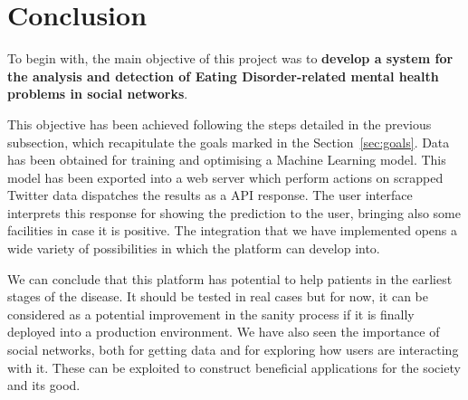 \section{Conclusion}
\label{sec:conclusion}

To begin with, the main objective of this project was to \textbf{develop a system for the analysis and detection of Eating Disorder-related mental health problems in social networks}.

This objective has been achieved following the steps detailed in the previous subsection, which recapitulate the goals marked in the Section~\ref{sec:goals}. Data has been obtained for training and optimising a Machine Learning model. This model has been exported into a web server which perform actions on scrapped Twitter data dispatches the results as a API response. The user interface interprets this response for showing the prediction to the user, bringing also some facilities in case it is positive. The integration that we have implemented opens a wide variety of possibilities in which the platform can develop into. 

We can conclude that this platform has potential to help patients in the earliest stages of the disease. It should be tested in real cases but for now, it can be considered as a potential improvement in the sanity process if it is finally deployed into a production environment. We have also seen the importance of social networks, both for getting data and for exploring how users are interacting with it. These can be exploited to construct beneficial applications for the society and its good.


